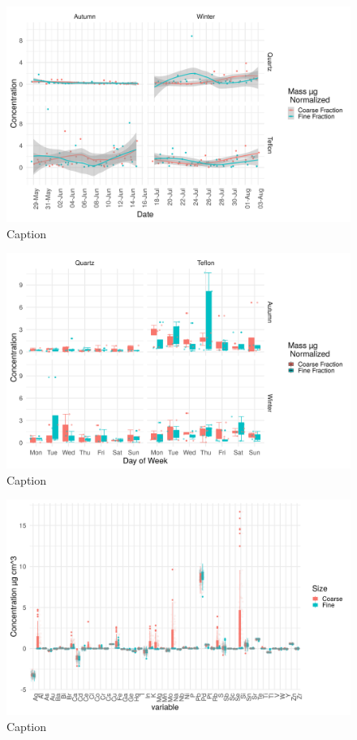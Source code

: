 \documentclass{nwureport}
\begin{document}
{\begin{figure}[!htb]
    \centering
    \includegraphics[width=\textwidth]{images/TS_FilterDateSizeSeason_sep_mass.png}
    \caption{Caption}
    \label{fig:summary}
\end{figure}

\begin{figure}[!htb]
    \centering
    \includegraphics[width=\textwidth]{images/TS_FilterDaySizeSeason_mass.png}
    \caption{Caption}
    \label{fig:summary}
\end{figure}


\begin{figure}[!htb]
    \centering
    \includegraphics[width=\textwidth]{images/xrf.png}
    \caption{Caption}
    \label{fig:summary}
\end{figure}

}
\end{document}
